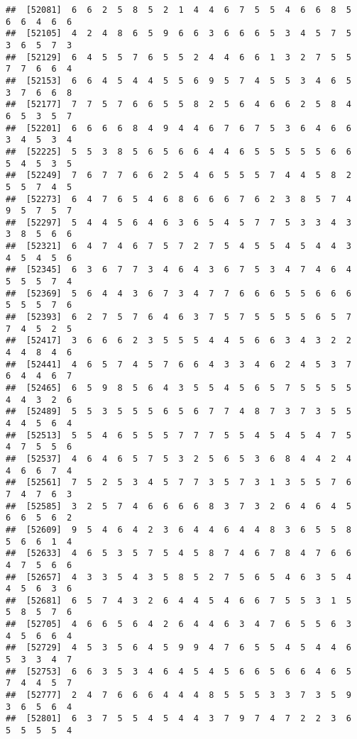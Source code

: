 \documentclass[
]{book}
\begin{document}
\begin{verbatim}
##  [52081]  6  6  2  5  8  5  2  1  4  4  6  7  5  5  4  6  6  8  5  6  6  4  6  6
##  [52105]  4  2  4  8  6  5  9  6  6  3  6  6  6  5  3  4  5  7  5  3  6  5  7  3
##  [52129]  6  4  5  5  7  6  5  5  2  4  4  6  6  1  3  2  7  5  5  7  7  6  6  4
##  [52153]  6  6  4  5  4  4  5  5  6  9  5  7  4  5  5  3  4  6  5  3  7  6  6  8
##  [52177]  7  7  5  7  6  6  5  5  8  2  5  6  4  6  6  2  5  8  4  6  5  3  5  7
##  [52201]  6  6  6  6  8  4  9  4  4  6  7  6  7  5  3  6  4  6  6  3  4  5  3  4
##  [52225]  5  5  3  8  5  6  5  6  6  4  4  6  5  5  5  5  5  6  6  5  4  5  3  5
##  [52249]  7  6  7  7  6  6  2  5  4  6  5  5  5  7  4  4  5  8  2  5  5  7  4  5
##  [52273]  6  4  7  6  5  4  6  8  6  6  6  7  6  2  3  8  5  7  4  9  5  7  5  7
##  [52297]  5  4  4  5  6  4  6  3  6  5  4  5  7  7  5  3  3  4  3  3  8  5  6  6
##  [52321]  6  4  7  4  6  7  5  7  2  7  5  4  5  5  4  5  4  4  3  4  5  4  5  6
##  [52345]  6  3  6  7  7  3  4  6  4  3  6  7  5  3  4  7  4  6  4  5  5  5  7  4
##  [52369]  5  6  4  4  3  6  7  3  4  7  7  6  6  6  5  5  6  6  6  5  5  5  7  6
##  [52393]  6  2  7  5  7  6  4  6  3  7  5  7  5  5  5  5  6  5  7  7  4  5  2  5
##  [52417]  3  6  6  6  2  3  5  5  5  4  4  5  6  6  3  4  3  2  2  4  4  8  4  6
##  [52441]  4  6  5  7  4  5  7  6  6  4  3  3  4  6  2  4  5  3  7  6  4  4  6  7
##  [52465]  6  5  9  8  5  6  4  3  5  5  4  5  6  5  7  5  5  5  5  4  4  3  2  6
##  [52489]  5  5  3  5  5  5  6  5  6  7  7  4  8  7  3  7  3  5  5  4  4  5  6  4
##  [52513]  5  5  4  6  5  5  5  7  7  7  5  5  4  5  4  5  4  7  5  4  7  5  5  6
##  [52537]  4  6  4  6  5  7  5  3  2  5  6  5  3  6  8  4  4  2  4  4  6  6  7  4
##  [52561]  7  5  2  5  3  4  5  7  7  3  5  7  3  1  3  5  5  7  6  7  4  7  6  3
##  [52585]  3  2  5  7  4  6  6  6  6  8  3  7  3  2  6  4  6  4  5  6  6  5  6  2
##  [52609]  9  5  4  6  4  2  3  6  4  4  6  4  4  8  3  6  5  5  8  5  6  6  1  4
##  [52633]  4  6  5  3  5  7  5  4  5  8  7  4  6  7  8  4  7  6  6  4  7  5  6  6
##  [52657]  4  3  3  5  4  3  5  8  5  2  7  5  6  5  4  6  3  5  4  4  5  6  3  6
##  [52681]  6  5  7  4  3  2  6  4  4  5  4  6  6  7  5  5  3  1  5  5  8  5  7  6
##  [52705]  4  6  6  5  6  4  2  6  4  4  6  3  4  7  6  5  5  6  3  4  5  6  6  4
##  [52729]  4  5  3  5  6  4  5  9  9  4  7  6  5  5  4  5  4  4  6  5  3  3  4  7
##  [52753]  6  6  3  5  3  4  6  4  5  4  5  6  6  5  6  6  4  6  5  7  4  4  5  7
##  [52777]  2  4  7  6  6  6  4  4  4  8  5  5  5  3  3  7  3  5  9  3  6  5  6  4
##  [52801]  6  3  7  5  5  4  5  4  4  3  7  9  7  4  7  2  2  3  6  5  5  5  5  4

\end{verbatim}
\end{document}
